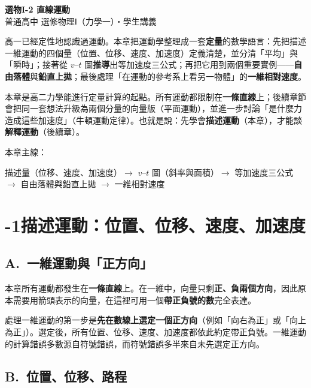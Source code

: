 \documentclass[11pt]{article}
\begin{document}

\begin{center}
{\sffamily\Huge\bfseries 選物I-2 直線運動}\\[3pt]
{\sffamily\large 普通高中 選修物理Ⅰ（力學一）・學生講義}
\end{center}
\vspace{0.6em}

高一已經定性地認識過運動。本章把運動學整理成一套\textbf{定量}的數學語言：先把描述一維運動的四個量（位置、位移、速度、加速度）定義清楚，並分清「平均」與「瞬時」；接著從 $v\text{–}t$ 圖\textbf{推導}出等加速度三公式；再把它用到兩個重要實例——\textbf{自由落體}與\textbf{鉛直上拋}；最後處理「在運動的參考系上看另一物體」的\textbf{一維相對速度}。

本章是高二力學能進行定量計算的起點。所有運動都限制在\textbf{一條直線}上；後續章節會把同一套想法升級為兩個分量的向量版（平面運動），並進一步討論「是什麼力造成這些加速度」（牛頓運動定律）。也就是說：先學會\textbf{描述運動}（本章），才能談\textbf{解釋運動}（後續章）。

\medskip
本章主線：

\begin{center}
描述量（位移、速度、加速度）$\rightarrow$ $v\text{–}t$ 圖（斜率與面積）$\rightarrow$ 等加速度三公式 $\rightarrow$ 自由落體與鉛直上拋 $\rightarrow$ 一維相對速度
\end{center}

\section*{-1\quad 描述運動：位置、位移、速度、加速度}

\subsection*{\sffamily A.\ 一維運動與「正方向」}

本章所有運動都發生在\textbf{一條直線}上。在一維中，向量只剩\textbf{正、負兩個方向}，因此原本需要用箭頭表示的向量，在這裡可用一個\textbf{帶正負號的數}完全表達。

處理一維運動的第一步是\textbf{先在數線上選定一個正方向}（例如「向右為正」或「向上為正」）。選定後，所有位置、位移、速度、加速度都依此約定帶正負號。一維運動的計算錯誤多數源自符號錯誤，而符號錯誤多半來自未先選定正方向。

\subsection*{\sffamily B.\ 位置、位移、路程}
\end{document}
